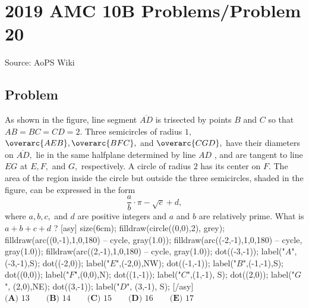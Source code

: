 \documentclass[12pt]{article}
\begin{document}
\section*{{2019 AMC 10B Problems/Problem 20}}
Source: AoPS Wiki

\subsection*{Problem}
As shown in the figure, line segment $\overline{AD}$ is trisected by points $B$ and $C$ so that $AB=BC=CD=2.$ Three semicircles of radius $1,$ $\overarc{AEB},\overarc{BFC},$ and $\overarc{CGD},$ have their diameters on $\overline{AD},$ lie in the same halfplane determined by line $AD$ , and are tangent to line $EG$ at $E,F,$ and $G,$ respectively. A circle of radius $2$ has its center on $F.$ The area of the region inside the circle but outside the three semicircles, shaded in the figure, can be expressed in the form \[\frac{a}{b}\cdot\pi-\sqrt{c}+d,\] where $a,b,c,$ and $d$ are positive integers and $a$ and $b$ are relatively prime. What is $a+b+c+d$ ? [asy] size(6cm); filldraw(circle((0,0),2), grey); filldraw(arc((0,-1),1,0,180) -- cycle, gray(1.0)); filldraw(arc((-2,-1),1,0,180) -- cycle, gray(1.0)); filldraw(arc((2,-1),1,0,180) -- cycle, gray(1.0)); dot((-3,-1)); label("$A$",(-3,-1),S); dot((-2,0)); label("$E$",(-2,0),NW); dot((-1,-1)); label("$B$",(-1,-1),S); dot((0,0)); label("$F$",(0,0),N); dot((1,-1)); label("$C$",(1,-1), S); dot((2,0)); label("$G$", (2,0),NE); dot((3,-1)); label("$D$", (3,-1), S); [/asy] $\textbf{(A) } 13 \qquad\textbf{(B) } 14 \qquad\textbf{(C) } 15 \qquad\textbf{(D) } 16\qquad\textbf{(E) } 17$
\end{document}
